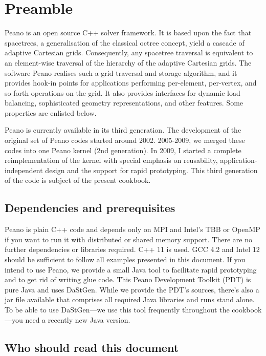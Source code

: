\chapter{Preamble}


 Peano is an open source C++ solver framework. It is based upon the fact that spacetrees, a generalisation of the classical octree concept, yield a cascade of adaptive Cartesian grids. Consequently, any spacetree traversal is equivalent to an element-wise traversal of the hierarchy of the adaptive Cartesian grids. The software Peano realises such a grid traversal and storage algorithm, and it provides hook-in points for applications performing per-element, per-vertex, and so forth operations on the grid. It also provides interfaces for dynamic load balancing, sophisticated geometry representations, and other features. Some properties are enlisted below.

Peano is currently available in its third generation. 
The development of the original set of Peano codes started around 2002.
2005-2009, we merged these codes into one Peano kernel (2nd generation). 
In 2009, I started a complete reimplementation of the kernel with special
emphasis on reusability, application-independent design and the support for rapid prototyping. 
This third generation of the code is subject of the present cookbook.


\section*{Dependencies and prerequisites}

Peano is plain C++ code and depends only on MPI and Intel's TBB or OpenMP if you want to run it with distributed or shared memory support. 
There are no further dependencies or libraries required. 
C++ 11 is used. 
GCC 4.2 and Intel 12 should be sufficient to follow all examples presented in
this document.
If you intend to use Peano, we provide a small Java tool to facilitate rapid
prototyping and to get rid of writing glue code. 
This Peano Development Toolkit (PDT) is pure Java and uses DaStGen. 
While we provide the PDT's sources, there's also a jar file available that comprises all required Java libraries and runs stand alone.
To be able to use DaStGen---we use this tool frequently throughout the
cookbook---you need a recently new Java version.


\section*{Who should read this document}

